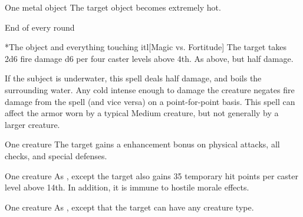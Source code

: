 \spellrng{\rngmed}
\spelldur{\durshort \dismissable}
\begin{spelltarget}{One metal object}
    \spelleffect The target object becomes extremely hot.
    \begin{spelltrigger}{End of every round}
        \begin{spelltargets}*{The object and everything touching it}l[Magic vs. Fortitude]
            \spellsuccess The target takes 2d6 fire damage \add d6 per four caster levels above 4th.
            \spellfailure As above, but half damage.
        \end{spelltargets}
    \end{spelltrigger}
\end{spelltarget}
\spellnotes If the subject is underwater, this spell deals half damage,  and boils the surrounding water. Any cold intense enough to damage the creature negates fire damage from the spell (and vice versa) on a point-for-point basis. This spell can affect the armor worn by a typical Medium creature, but not generally by a larger creature.

\spellrng{\rngclose}
\spelldur{\durshort \dismissable}
\begin{spelltarget}{One creature}
    \spelleffect The target gains a  enhancement bonus on physical attacks, all checks, and special defenses. \spellbonusscalingdescription
\end{spelltarget}

\spellrng{\rngclose}
\spelldur{\durshort \dismissable}
\begin{spelltarget}{One creature}
    \spelleffect As , except the target also gains 35 temporary hit points  per caster level above 14th. In addition, it is immune to hostile morale effects.
\end{spelltarget}

\spellrng{\rngclose}
\begin{spelltarget}{One creature}
    \spellsuccess As , except that the target can have any creature type.
\end{spelltarget}

